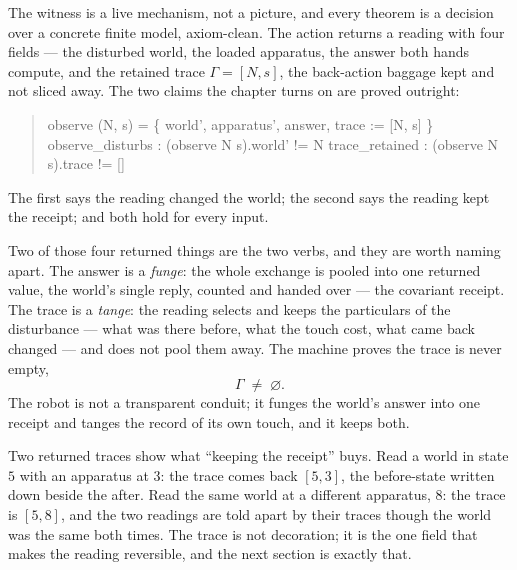 The witness is a live mechanism, not a picture, and every theorem is a decision over a concrete finite model, axiom-clean.
The action returns a reading with four fields --- the disturbed world, the loaded apparatus, the answer both hands
compute, and the retained trace $\Gamma = [N, s]$, the back-action baggage kept and not sliced away.
The two claims the chapter turns on are proved outright:
\begin{quote}\ttfamily
observe (N, s) = \{ world', apparatus', answer, trace := [N, s] \}\\
observe\_disturbs : (observe N s).world' != N \qquad trace\_retained : (observe N s).trace != []
\end{quote}
The first says the reading changed the world; the second says the reading kept the receipt; and both hold for every input.

Two of those four returned things are the two verbs, and they are worth naming apart.
The answer is a \emph{funge}: the whole exchange is pooled into one returned value, the world's single reply, counted
and handed over --- the covariant receipt.
The trace is a \emph{tange}: the reading selects and keeps the particulars of the disturbance --- what was there before,
what the touch cost, what came back changed --- and does not pool them away.
The machine proves the trace is never empty,
\[
  \Gamma \;\neq\; \varnothing .
\]
The robot is not a transparent conduit; it funges the world's answer into one receipt and tanges the record of its own
touch, and it keeps both.

Two returned traces show what ``keeping the receipt'' buys.
Read a world in state $5$ with an apparatus at $3$: the trace comes back $[5,3]$, the before-state written down beside the
after.
Read the same world at a different apparatus, $8$: the trace is $[5,8]$, and the two readings are told apart by their
traces though the world was the same both times.
The trace is not decoration; it is the one field that makes the reading reversible, and the next section is exactly that.

